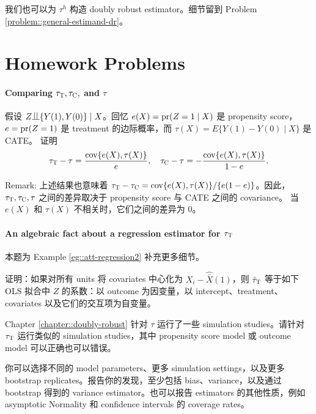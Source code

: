 我们也可以为 $\tau^h$ 构造 doubly robust estimator。细节留到 Problem \ref{problem::general-estimand-dr}。
 
 
 \section{Homework Problems}
 
 
\paragraph{Comparing $\tau_\textsc{T},  \tau_\textsc{C}, $ and $\tau$}\label{hw::difference-tau-T-tau} 
 
假设 $Z\ind \{Y(1), Y(0)\} \mid X$。回忆 $e(X) = \textup{pr}(Z=1\mid X)$ 是 propensity score，$e = \textup{pr}(Z=1)$ 是 treatment 的边际概率，而 $\tau(X) = E\{  Y(1)-Y(0) \mid X \}$ 是 CATE。
证明
$$
\tau_\textsc{T} - \tau = \frac{  \textup{cov}\{ e(X) ,  \tau(X)  \} }{e},\quad
\tau_\textsc{C} - \tau = - \frac{  \textup{cov}\{ e(X) ,  \tau(X)  \} }{1-e}.
$$ 


Remark: 上述结果也意味着 $ \tau_\textsc{T} -  \tau_\textsc{C} =  \textup{cov}\{ e(X) ,  \tau(X)  \} / \{  e(1-e) \}$。因此，$ \tau_\textsc{T} ,   \tau_\textsc{C} , \tau$ 之间的差异取决于 propensity score 与 CATE 之间的 covariance。
当 $e(X) $ 和 $  \tau(X) $ 不相关时，它们之间的差异为 0。
 
 
\paragraph{An algebraic fact about a regression estimator for $\tau_\textsc{T}$} 
 \label{para::regression-att-algebra}
 
 本题为 Example \ref{eg::att-regression2} 补充更多细节。
 
证明：如果对所有 units 将 covariates 中心化为 $X_i - \hat{\bar{X}}(1)$，则 $\hat{\tau}_\textsc{T} $ 等于如下 OLS 拟合中 $Z$ 的系数：以 outcome 为因变量，以 intercept、treatment、covariates 以及它们的交互项为自变量。
 
 
 
Chapter \ref{chapter::doubly-robust} 针对 $\tau$ 运行了一些 simulation studies。请针对 $\tau_\textsc{T}$ 运行类似的 simulation studies，其中 propensity score model 或 outcome model 可以正确也可以错误。

你可以选择不同的 model parameters、更多 simulation settings，以及更多 bootstrap replicates。报告你的发现，至少包括 bias、variance，以及通过 bootstrap 得到的 variance estimator。也可以报告 estimators 的其他性质，例如 asymptotic Normality 和 confidence intervals 的 coverage rates。



